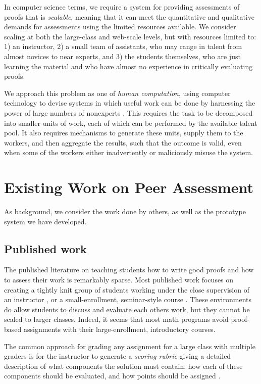 \documentclass[12pt]{article}
\begin{document}
In computer science terms, we require a system for providing
assessments of proofs that is {\em scalable}, meaning that it can meet
the quantitative and qualitative demands for assessments using the
limited resources available.  We consider scaling at both the
large-class and web-scale levels, but with 
resources limited to: 1) an instructor, 2) a small team of assistants,
who may range in talent from almost novices to near experts, and 3) the
students themselves, who are just learning the material and who have
almost no experience in critically evaluating proofs.

We approach this problem as one of {\em human computation}, using
computer technology to devise systems in which useful work can be done by
harnessing the power of large numbers of nonexperts
\cite{quinn-chi11, vonahn05}.  This requires
the task to be decomposed into smaller units of work, each of which 
can be performed by the available talent pool.  It also requires
mechanisms to generate these units, supply them to the workers, and
then aggregate the results, such that the outcome is valid, even when
some of the workers either inadvertently or maliciously misuse the system.

\section{Existing Work on Peer Assessment}

As background, we consider the work done by others, as well as the
prototype system we have developed.

\subsection{Published work}

The published literature on teaching students how to write good proofs
and how to assess their work is remarkably sparse.  Most published
work focuses on creating a tightly knit group of students working
under the close supervision of an instructor
\cite{cohen-amm82,jones-amm77}, or a small-enrollment, seminar-style
course \cite{reisel-amm82}.  These environments do allow students to
discuss and evaluate each others work, but they cannot be scaled to
larger classes.  Indeed, it seems that most math programs avoid
proof-based assignments with their large-enrollment, introductory
courses.

The common approach for grading any assignment for a large
class with multiple graders is for the instructor to generate a {\em
  scoring rubric} giving a detailed description of what components the
solution must contain, how each of these components should be
evaluated, and how points should be assigned
\cite{moskal-pa2000}.
\end{document}
